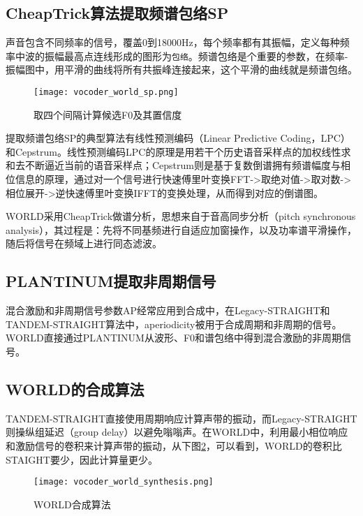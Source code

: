 \documentclass[cn,10pt,math=newtx,citestyle=gb7714-2015,bibstyle=gb7714-2015]{elegantbook}
\begin{document}
\subsection{CheapTrick算法提取频谱包络SP}

声音包含不同频率的信号，覆盖0到18000Hz，每个频率都有其振幅，定义每种频率中波的振幅最高点连线形成的图形为\lstinline{包络}。频谱包络是个重要的参数，在频率-振幅图中，用平滑的曲线将所有共振峰连接起来，这个平滑的曲线就是频谱包络。

\begin{figure}[htbp]
  \centering
  \texttt{[image: vocoder\_world\_sp.png]}
  \caption{取四个间隔计算候选F0及其置信度 \label{fig:vocoder_world_sp}}
\end{figure}

提取频谱包络SP的典型算法有线性预测编码（Linear Predictive Coding，LPC）和Cepstrum。线性预测编码LPC的原理是用若干个历史语音采样点的加权线性求和去不断逼近当前的语音采样点；Cepstrum则是基于复数倒谱拥有频谱幅度与相位信息的原理，通过对一个信号进行快速傅里叶变换FFT->取绝对值->取对数->相位展开->逆快速傅里叶变换IFFT的变换处理，从而得到对应的倒谱图。

WORLD采用CheapTrick做谱分析，思想来自于音高同步分析（pitch synchronous analysis），其过程是：先将不同基频进行自适应加窗操作，以及功率谱平滑操作，随后将信号在频域上进行同态滤波。

\subsection{PLANTINUM提取非周期信号}

混合激励和非周期信号参数AP经常应用到合成中，在Legacy-STRAIGHT和TANDEM-STRAIGHT算法中，aperiodicity被用于合成周期和非周期的信号。WORLD直接通过PLANTINUM从波形、F0和谱包络中得到混合激励的非周期信号。

\subsection{WORLD的合成算法}

TANDEM-STRAIGHT直接使用周期响应计算声带的振动，而Legacy-STRAIGHT则操纵组延迟（group delay）以避免嗡嗡声。在WORLD中，利用最小相位响应和激励信号的卷积来计算声带的振动，从下图\ref{fig:vocoder_world_synthesis}，可以看到，WORLD的卷积比STAIGHT要少，因此计算量更少。

\begin{figure}[htbp]
  \centering
  \texttt{[image: vocoder\_world\_synthesis.png]}
  \caption{WORLD合成算法 \label{fig:vocoder_world_synthesis}}
\end{figure}
\end{document}
